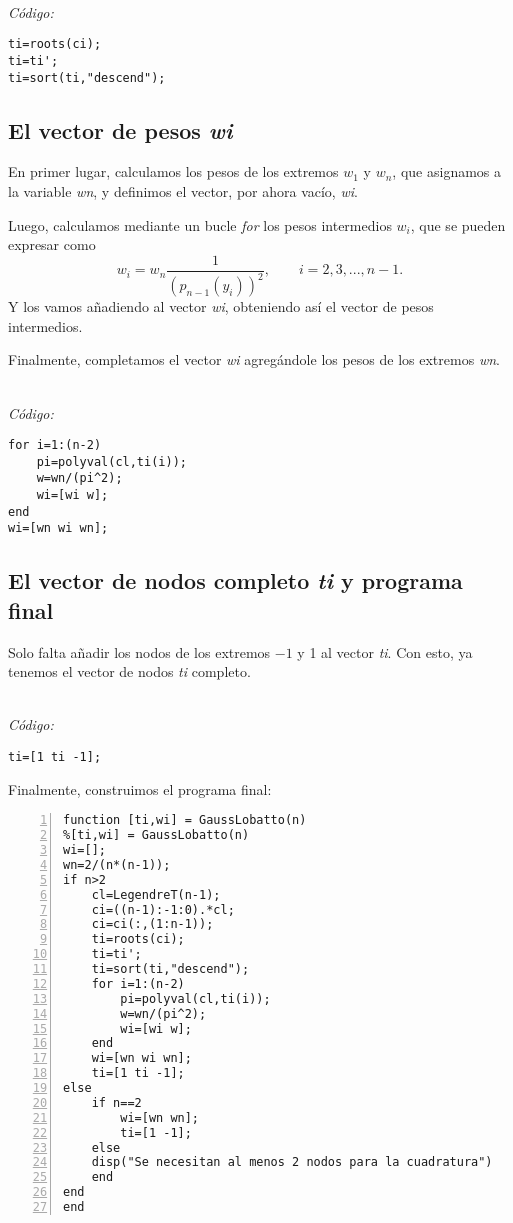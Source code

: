 \documentclass[a4paper]{article}
\begin{document}
\textit{\\Código:}

\begin{lstlisting}[frame=single, style=Matlab-Pyglike]
ti=roots(ci);
ti=ti';
ti=sort(ti,"descend");
\end{lstlisting}

\subsection{El vector de pesos \textit{wi}}
En primer lugar, calculamos los pesos de los extremos $w_1$ y $w_n$, que asignamos a la variable \textit{wn}, y definimos el vector, por ahora vacío, \textit{wi}.

Luego, calculamos mediante un bucle \textit{for} los pesos intermedios $w_i$, que se pueden expresar como
\[
w_i=w_n\frac{1}{(p_{n-1}(y_i))^2},\qquad i=2,3,...,n-1.
\]
Y los vamos añadiendo al vector \textit{wi}, obteniendo así el vector de pesos intermedios.

Finalmente, completamos el vector \textit{wi} agregándole los pesos de los extremos \textit{wn}.

\textit{\\Código:}

\begin{lstlisting}[frame=single, style=Matlab-Pyglike]
for i=1:(n-2)
    pi=polyval(cl,ti(i));
    w=wn/(pi^2);
    wi=[wi w];
end
wi=[wn wi wn];
\end{lstlisting}

\subsection{El vector de nodos completo \textit{ti} y programa final}
Solo falta añadir los nodos de los extremos $-1$ y 1 al vector \textit{ti}. Con esto, ya tenemos el vector de nodos \textit{ti} completo.

\textit{\\Código:}

\begin{lstlisting}[frame=single, style=Matlab-Pyglike]
ti=[1 ti -1];
\end{lstlisting}

Finalmente, construimos el programa final:

\begin{lstlisting}[frame=single, numbers=left, style=Matlab-Pyglike]
function [ti,wi] = GaussLobatto(n)
%[ti,wi] = GaussLobatto(n)
wi=[];
wn=2/(n*(n-1));
if n>2
    cl=LegendreT(n-1);
    ci=((n-1):-1:0).*cl;
    ci=ci(:,(1:n-1));
    ti=roots(ci);
    ti=ti';
    ti=sort(ti,"descend");
    for i=1:(n-2)
        pi=polyval(cl,ti(i));
        w=wn/(pi^2);
        wi=[wi w];
    end
    wi=[wn wi wn];
    ti=[1 ti -1];
else 
    if n==2
        wi=[wn wn];
        ti=[1 -1];
    else
    disp("Se necesitan al menos 2 nodos para la cuadratura")
    end
end
end
\end{lstlisting}
\end{document}
